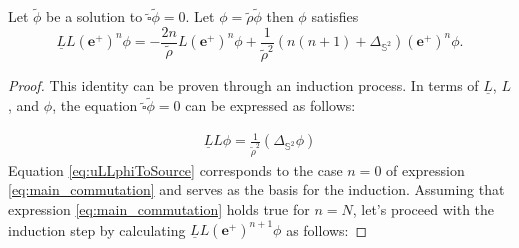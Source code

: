 \begin{proposition}\label{prop:main_commutation}
  Let $\tilde{\phi}$ be a solution to $\tilde{\square}\tilde{\phi}=0.$ Let $\phi = \tilde{\rho}\tilde{\phi}$ then $\phi$ satisfies
  \begin{equation}\label{eq:main_commutation}
     \underline{L} L (\boldsymbol{e}^{+})^n \phi = -\frac{2n}{\tilde{\rho}}L (\boldsymbol{e}^{+})^n
     \phi + \frac{1}{\tilde{\rho}^2}(n(n+1) + \Delta_{\mathbb{S}^2})(\boldsymbol{e}^+)^n \phi.
  \end{equation}
\end{proposition}
\pagebreak
\begin{proof}
  This identity can be proven through an induction process. In terms of $\underline{L}$, $L$, and $\phi$, the equation $\tilde{\square}\tilde{\phi}=0$ can be expressed as follows:

\begin{align}\label{eq:uLLphiToSource}
  \underline{L} L \phi = \frac{1}{\tilde{\rho}^2}(\Delta_{\mathbb{S}^2} \phi)
\end{align}
Equation \eqref{eq:uLLphiToSource} corresponds to the case $n=0$ of expression \eqref{eq:main_commutation} and serves as the basis for the induction. Assuming that expression \eqref{eq:main_commutation} holds true for $n=N$, let's proceed with the induction step by calculating $\underline{L} L (\boldsymbol{e}^+)^{n+1} \phi$ as follows:

\setlength{\jot}{10pt}



\end{proof}
